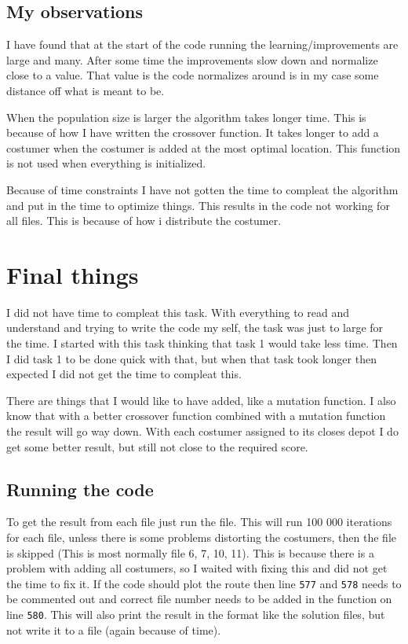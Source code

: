 \documentclass[10pt]{article}
\begin{document}
    \subsection{My observations}
    I have found that at the start of the code running the learning/improvements are large and many. After some time the improvements slow down and normalize close to a value. That value is the code normalizes around is in my case some distance off what is meant to be.

    When the population size is larger the algorithm takes longer time. This is because of how I have written the crossover function. It takes longer to add a costumer when the costumer is added at the most optimal location. This function is not used when everything is initialized.

    Because of time constraints I have not gotten the time to compleat the algorithm and put in the time to optimize things. This results in the code not working for all files. This is because of how i distribute the costumer. 

    \section{Final things}
    I did not have time to compleat this task. With everything to read and understand and trying to write the code my self, the task was just to large for the time. I started with this task thinking that task 1 would take less time. Then I did task 1 to be done quick with that, but when that task took longer then expected I did not get the time to compleat this.
    
    There are things that I would like to have added, like a mutation function. I also know that with a better crossover function combined with a mutation function the result will go way down. With each costumer assigned to its closes depot I do get some better result, but still not close to the required score.

    \subsection{Running the code}
    To get the result from each file just run the file. This will run 100 000 iterations for each file, unless there is some problems distorting the costumers, then the file is skipped (This is most normally file 6, 7, 10, 11). This is because there is a problem with adding all costumers, so I waited with fixing this and did not get the time to fix it.
    If the code should plot the route then line \texttt{577} and \texttt{578} needs to be commented out and correct file number needs to be added in the function on line \texttt{580}. This will also print the result in the format like the solution files, but not write it to a file (again because of time).
\end{document}
